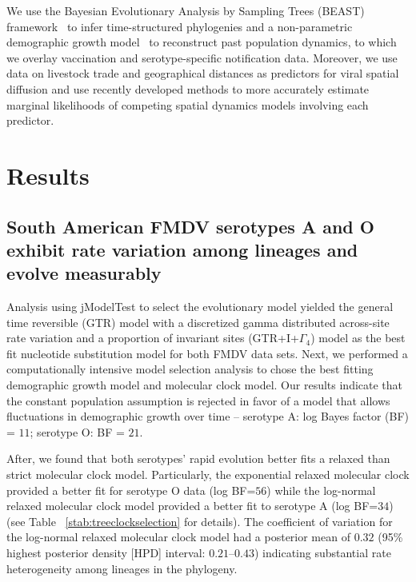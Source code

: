 \documentclass[10pt]{article}
\begin{document}
We use the Bayesian Evolutionary Analysis by Sampling Trees (BEAST) framework~\cite{beast2012} to infer time-structured phylogenies and a non-parametric demographic growth model~\cite{skyride} to reconstruct past population dynamics, to which we overlay  vaccination and serotype-specific notification data.
Moreover, we use data on livestock trade and geographical distances as predictors for viral spatial diffusion and use recently developed methods to more accurately estimate marginal likelihoods of competing spatial dynamics models involving each predictor.

\section*{Results}

\subsection*{South American FMDV serotypes A and O exhibit rate variation among lineages and evolve measurably}

Analysis using jModelTest to select the evolutionary model yielded the general time reversible (GTR) model with a discretized gamma distributed across-site rate variation and a proportion of invariant sites (GTR+I+$\Gamma_{4}$) model as the best fit nucleotide substitution model for both FMDV data sets.
Next, we performed a computationally intensive model selection analysis to chose the best fitting demographic growth model and molecular clock model.
Our results indicate that the constant population assumption is rejected in favor of a model that allows fluctuations in demographic growth over time -- serotype A: log Bayes factor (BF) = $11$; serotype O: BF = $21$. %

After, we found that both serotypes' rapid evolution better fits a relaxed than strict molecular clock model.
Particularly, the exponential relaxed molecular clock provided a better fit for serotype O data (log BF=$56$) while the log-normal relaxed molecular clock model provided a better fit to serotype A (log BF=$34$) 
(see Table ~\ref{stab:treeclockselection} for details). 
The coefficient of variation for the log-normal relaxed molecular clock model had a posterior mean of $0.32$ (95\% highest posterior density [HPD] interval: $ 0.21$--$0.43$) 
indicating substantial rate heterogeneity among lineages in the phylogeny. 
\end{document}
